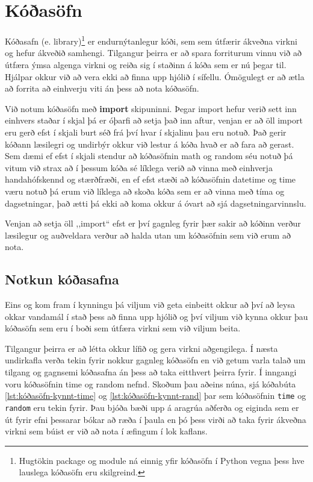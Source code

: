 
\chapter{Kóðasöfn}\label{k:import}
Kóðasafn (e. library)\footnote{Hugtökin package og module ná einnig yfir kóðasöfn í Python vegna þess hve lauslega kóðasöfn eru skilgreind.} er endurnýtanlegur kóði, sem sem útfærir ákveðna virkni og hefur ákveðið samhengi.
Tilgangur þeirra er að spara forriturum vinnu við að útfæra ýmsa algenga virkni og reiða sig í staðinn á kóða sem er nú þegar til.
Hjálpar okkur við að vera ekki að finna upp hjólið í sífellu.
Ómögulegt er að ætla að forrita að einhverju viti án þess að nota kóðasöfn.

Við notum kóðasöfn með \textbf{import} skipuninni. 
Þegar import hefur verið sett inn einhvers staðar í skjal þá er óþarfi að setja það inn aftur, venjan er að öll import eru gerð efst í skjali burt séð frá því hvar í skjalinu þau eru notuð.
Það gerir kóðann læsilegri og undirbýr okkur við lestur á kóða hvað er að fara að gerast.
Sem dæmi ef efst í skjali stendur að kóðasöfnin math og random séu notuð þá vitum við strax að í þessum kóða sé líklega verið að vinna með einhverja handahófskennd og stærðfræði, en ef efst stæði að kóðasöfnin datetime og time væru notuð þá erum við líklega að skoða kóða sem er að vinna með tíma og dagsetningar, það ætti þá ekki að koma okkur á óvart að sjá dagsetningarvinnslu.

Venjan að setja öll ,,import“ efst er því gagnleg fyrir þær sakir að kóðinn verður læsilegur og auðveldara verður að halda utan um kóðasöfnin sem við erum að nota.

\section{Notkun kóðasafna}\label{uk:kóðasöfn-kynnt}
Eins og kom fram í kynningu þá viljum við geta einbeitt okkur að því að leysa okkar vandamál í stað þess að finna upp hjólið og því viljum við kynna okkur þau kóðasöfn sem eru í boði sem útfæra virkni sem við viljum beita.

Tilgangur þeirra er að létta okkur lífið og gera virkni aðgengilega.
Í næsta undirkafla verða tekin fyrir nokkur gagnleg kóðasöfn en við getum varla talað um tilgang og gagnsemi kóðasafna án þess að taka eitthvert þeirra fyrir.
Í inngangi voru kóðasöfnin time og random nefnd.
Skoðum þau aðeins núna, sjá kóðabúta \ref{lst:kóðasöfn-kynnt-time} og \ref{lst:kóðasöfn-kynnt-rand} þar sem kóðasöfnin \texttt{time} og \texttt{random} eru tekin fyrir.
Þau bjóða bæði upp á aragrúa aðferða og eiginda sem er út fyrir efni þessarar bókar að ræða í þaula en þó þess virði að taka fyrir ákveðna virkni sem búist er við að nota í æfingum í lok kaflans.
